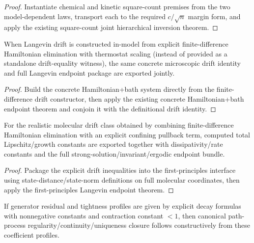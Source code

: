 \begin{proof}
Instantiate chemical and kinetic square-count premises from the two model-dependent laws, transport each to the required $c/\sqrt{n}$ margin form, and apply the existing square-count joint hierarchical inversion theorem.
\end{proof}

\begin{theorem}\label{thm:hamiltonian-finite-difference-drift-derivation-endpoints}
When Langevin drift is constructed in-model from explicit finite-difference Hamiltonian elimination with thermostat scaling (instead of provided as a standalone drift-equality witness), the same concrete microscopic drift identity and full Langevin endpoint package are exported jointly.
\end{theorem}

\begin{proof}
Build the concrete Hamiltonian+bath system directly from the finite-difference drift constructor, then apply the existing concrete Hamiltonian+bath endpoint theorem and conjoin it with the definitional drift identity.
\end{proof}

\begin{theorem}\label{thm:realistic-molecular-finite-difference-sde-endpoints}
For the realistic molecular drift class obtained by combining finite-difference Hamiltonian elimination with an explicit confining pullback term, computed total Lipschitz/growth constants are exported together with dissipativity/rate constants and the full strong-solution/invariant/ergodic endpoint bundle.
\end{theorem}

\begin{proof}
Package the explicit drift inequalities into the first-principles interface using state-distance/state-norm definitions on full molecular coordinates, then apply the first-principles Langevin endpoint theorem.
\end{proof}

\begin{theorem}\label{thm:generator-coefficients-canonical-regularity-closure}
If generator residual and tightness profiles are given by explicit decay formulas with nonnegative constants and contraction constant $<1$, then canonical path-process regularity/continuity/uniqueness closure follows constructively from these coefficient profiles.
\end{theorem}

